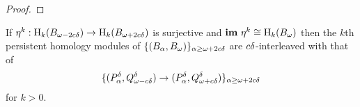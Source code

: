 \begin{proof}
\end{proof}

\begin{corollary}\label{cor:geo_inter}
  If $\eta^k : \mathrm{H}_k(B_{\omega - 2c{\delta}})\to \mathrm{H}_k(B_{\omega + 2c{\delta}})$ is surjective and $\mathbf{im}~\eta^k\cong \mathrm{H}_k(B_\omega)$ then the $k$th persistent homology modules of
  $\{(B_\alpha, B_\omega)\}_{\alpha\geq\omega + 2c{\delta}}$ are $c{\delta}$-interleaved with that of
  \[\{(P_\alpha^{\delta}, Q_{\omega - c{\delta}}^{\delta})\to (P_\alpha^{\delta}, Q_{\omega + c{\delta}}^{\delta})\}_{\alpha\geq\omega + 2c{\delta}}\]
  for $k > 0$.
\end{corollary}
